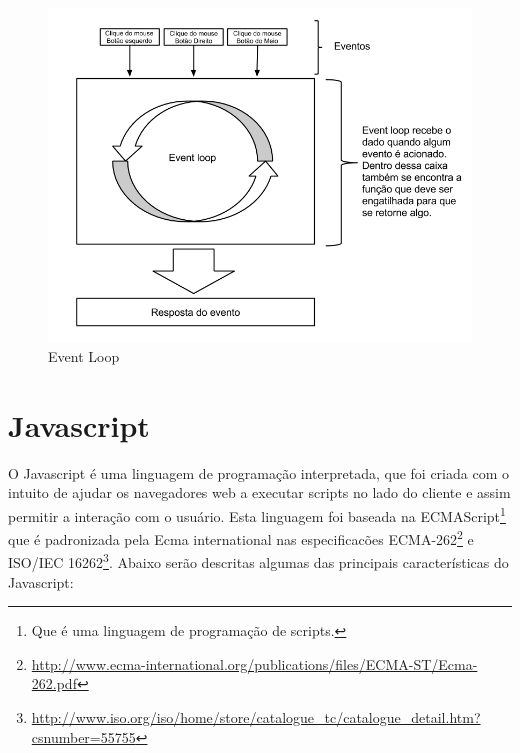 \begin{figure}[htb]
\centering
\includegraphics[scale=0.6]{images/event_loop_diagram.png}
\caption{Event Loop}
\label{fig:event loop}
\end{figure}

\newpage

\section{Javascript}
\label{sec: Javascript}
O Javascript  é uma linguagem de programação interpretada, que foi criada com o intuito de ajudar os navegadores web a executar scripts no lado do cliente e assim permitir a interação com o usuário\nocite{jsGood}. Esta linguagem foi baseada na ECMAScript\footnote{Que  é uma linguagem de programação de scripts.} que é padronizada pela Ecma international nas especificacões ECMA-262\footnote{\url{http://www.ecma-international.org/publications/files/ECMA-ST/Ecma-262.pdf}} e ISO/IEC 16262\footnote{\url{http://www.iso.org/iso/home/store/catalogue_tc/catalogue_detail.htm?csnumber=55755}}. Abaixo serão descritas algumas das principais características do Javascript:

